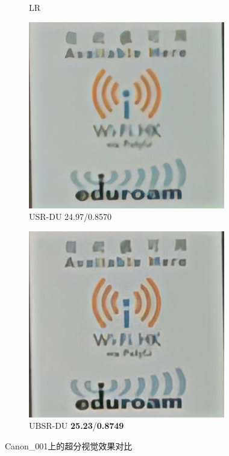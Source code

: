 \begin{figure}[htbp]
\begin{subfigure}{0.3\textwidth}
        \caption{LR} 
    \end{subfigure}
    \hfill
    \begin{subfigure}{0.3\textwidth}
        \includegraphics[width=\linewidth]{imgs/USR_DU_24.97_0.8570_Canon_001.png}
        \caption{USR-DU 24.97/0.8570} 
    \end{subfigure}
    \hfill
    \begin{subfigure}{0.3\textwidth}
        \includegraphics[width=\linewidth]{imgs/UBSR_DU_25.23_0.8749_Canon_001.png}
        \caption{UBSR-DU \textbf{25.23}/\textbf{0.8749}} 
    \end{subfigure}
    \caption{Canon\_001上的超分视觉效果对比}
    \label{fig:Canon001}
\end{figure}


